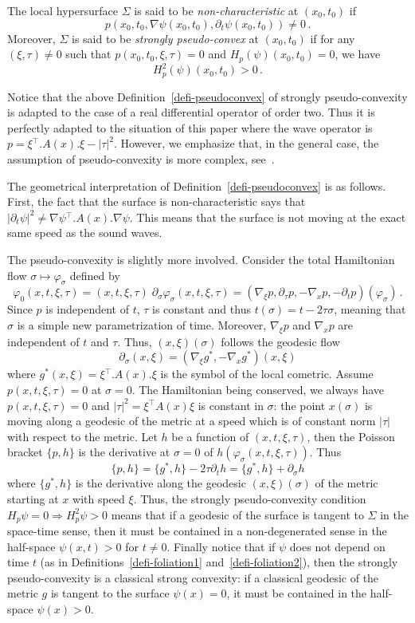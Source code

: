\documentclass[AHL,Unicode,longabstracts]{cedram}
\newcommand{\grad}{\nabla}
\newcommand{\trans}{{^{\intercal}}}
\begin{document}
\begin{defi}\label{defi-pseudoconvex}
The local hypersurface $\Sigma$ is said to be \emph{non-characteristic} at $(x_0,t_0)$ if
\[
p(x_0,t_0,\grad \psi(x_0,t_0),\partial_t \psi(x_0,t_0))\neq 0\,.
\]
Moreover, $\Sigma$ is said to be \emph{strongly pseudo-convex} at $(x_0,t_0)$ if for any $(\xi,\tau)\neq 0$ such that $p(x_0,t_0,\xi,\tau)=0$ and $H_p(\psi)(x_0,t_0)=0$, we have
\[
H_p^2(\psi)(x_0,t_0)>0\,.
\]
\end{defi}

Notice that the above Definition~\ref{defi-pseudoconvex} of strongly pseudo-convexity is adapted to the case of a real differential operator of order two. Thus it is perfectly adapted to the situation of this paper where the wave operator is $p=\xi\trans.A(x).\xi-|\tau|^2$. However, we emphasize that, in the general case, the assumption of pseudo-convexity is more complex, see~\cite{Hormander}.

The geometrical interpretation of Definition~\ref{defi-pseudoconvex} is as follows. First, the fact that the surface is non-characteristic says that $|\partial_t \psi|^2 \neq \grad\psi\trans.A(x).\grad \psi$. This means that the surface is not moving at the exact same speed as the sound waves.

The pseudo-convexity is slightly more involved. Consider the total Hamiltonian flow $\sigma\mapsto\varphi_\sigma$ defined by
\[
\varphi_0(x,t,\xi,\tau)=(x,t,\xi,\tau)\;\partial_\sigma
\varphi_\sigma(x,t,\xi,\tau)=(\grad_\xi p,\partial_\tau
p,-\grad_x p,-\partial_t p)(\varphi_\sigma)\,.
\]
Since $p$ is independent of $t$, $\tau$ is constant and thus $t(\sigma)=t-2\tau\sigma$, meaning that $\sigma$ is a simple new parametrization of time. Moreover, $\grad_\xi p$ and $\grad_x p$ are independent of $t$ and $\tau$. Thus, $(x,\xi)(\sigma)$ follows the geodesic flow
\[
\partial_\sigma (x,\xi)=(\grad_\xi g^*,-\grad_x g^*)(x,\xi)
\]
where $g^{*}(x,\xi)=\xi\trans.A(x).\xi$ is the symbol of the local cometric. Assume $p(x,t,\xi,\tau)=0$ at $\sigma=0$. The Hamiltonian being conserved, we always have $p(x,t,\xi,\tau)=0$ and $|\tau|^2=\xi\trans A(x)\xi$ is constant in $\sigma$: the point $x(\sigma)$ is moving along a geodesic of the metric at a speed which is of constant norm $|\tau|$ with respect to the metric. Let $h$ be a function of $(x,t,\xi,\tau)$, then the Poisson bracket $\{p,h\}$ is the derivative at $\sigma=0$ of $h(\varphi_\sigma(x,t,\xi,\tau))$. Thus
\[
\{p,h\}=\{g^*,h\} -2\tau \partial_t h=\{g^*,h\} + \partial_\sigma h
\]
where $\{g^*,h\}$ is the derivative along the geodesic $(x,\xi)(\sigma)$ of the metric starting at $x$ with speed $\xi$. Thus, the strongly pseudo-convexity condition $H_p\psi=0\Rightarrow H_p^2 \psi>0$ means that if a geodesic of the surface is tangent to $\Sigma$ in the space-time sense, then it must be contained in a non-degenerated sense in the half-space $\psi(x,t)>0$ for $t\neq0$. Finally notice that if $\psi$ does not depend on time $t$ (as in Definitions~\ref{defi-foliation1} and~\ref{defi-foliation2}), then the strongly pseudo-convexity is a classical strong convexity: if a classical geodesic of the metric $g$ is tangent to the surface $\psi(x)=0$, it must be contained in the half-space $\psi(x)>0$.
\end{document}
